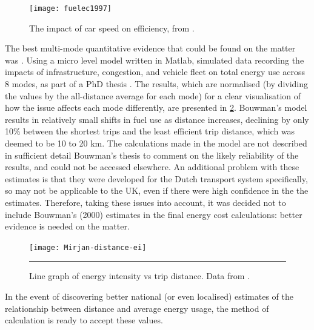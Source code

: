 \begin{figure}[h]
  \centerline{
    \texttt{[image: fuelec1997]}}
  \caption{The impact of car speed on efficiency, from
\citep{Anas2012-price-gas}.}
  \label{f:speeding-car}
\end{figure}

The best multi-mode quantitative evidence that could be found on the matter was
\citep{bouwman2000tracking}. Using a micro level model written in
Matlab, simulated data recording the impacts of infrastructure, congestion,
and vehicle fleet on total energy use across 8 modes, as part of a PhD thesis
\citep{bouwman2000tracking}. The results, which are
normalised (by dividing the values by the all-distance average for each mode)
for a clear visualisation of how the issue affects each
mode differently, are presented in \cref{f:mirjan}. Bouwman's
\citeyear{bouwman2000tracking} model results in relatively small
shifts in fuel use as distance increases, declining by only 10\% between the
shortest trips and the least efficient trip distance, which was deemed to be 10
to 20 km. The calculations made in the model are not described in sufficient
detail Bouwman's thesis to comment on the likely reliability of the results, and
could not be accessed elsewhere. An additional problem with these estimates is
that they were developed for the Dutch transport system specifically, so may
not be applicable to the UK, even if there were high confidence in the
the estimates. Therefore, taking these issues into account, it was decided not
to include Bouwman's (2000) estimates in the final
energy cost calculations: better evidence is needed on the matter.

\begin{figure}[h]
  \centerline{
    \texttt{[image: Mirjan-distance-ei]}}
    \rule{35em}{0.5pt}
  \caption[Line graph of energy intensity vs trip distance]
  {Line graph of energy intensity vs trip distance. Data from
\citet{bouwman2000tracking}.}
  \label{f:mirjan}
\end{figure}

In the event of discovering better national (or even localised) estimates of
the relationship between distance and average energy usage, the method of
calculation is ready to accept these values.

